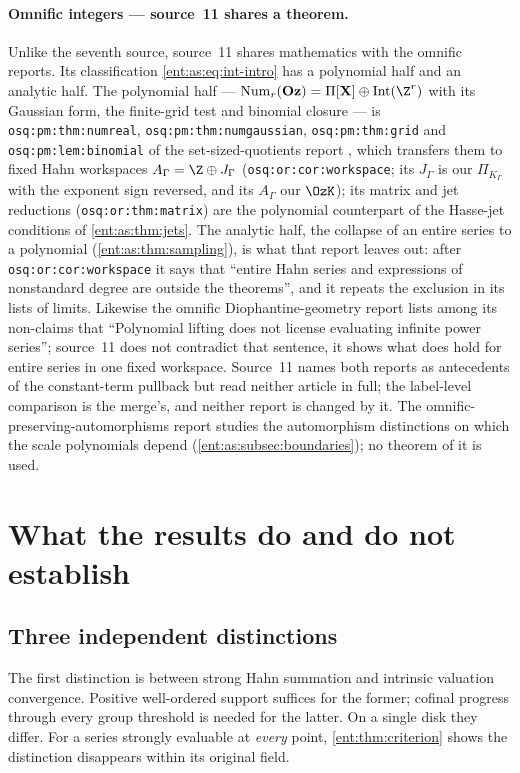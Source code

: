 \documentclass[11pt]{article}
\theoremstyle{plain}
\theoremstyle{plain}
\theoremstyle{plain}
\theoremstyle{definition}
\theoremstyle{definition}
\theoremstyle{definition}
\theoremstyle{definition}
\theoremstyle{remark}
\newcommand{\K}{K_\Gamma}\newcommand{\KD}{K_\Delta}
\newcommand{\Oz}{\mathbf{Oz}}\newcommand{\Ed}{\mathcal E_{\Gamma,d}}
\newcommand{\PiK}{\Pi_{\K}}\newcommand{\pg}{\mathsf p}
\DeclareMathOperator{\Int}{Int}\DeclareMathOperator{\ct}{ct}
\begin{document}
\paragraph{Omnific integers --- source~11 shares a theorem.}
Unlike the seventh source, source~11 shares mathematics with the omnific
reports. Its classification \eqref{ent:as:eq:int-intro} has a polynomial half
and an analytic half. The polynomial half ---
$\operatorname{Num}_r(\Oz)=\Pi[\mathbf X]\oplus\Int(\Z^r)$ with its Gaussian form,
the finite-grid test and binomial closure --- is \texttt{osq:pm:thm:numreal},
\texttt{osq:pm:thm:numgaussian}, \texttt{osq:pm:thm:grid} and
\texttt{osq:pm:lem:binomial} of the set-sized-quotients report
\cite{RepoQuotients}, which transfers them to fixed Hahn workspaces
$A_\Gamma=\Z\oplus J_\Gamma$ (\texttt{osq:or:cor:workspace}; its $J_\Gamma$ is
our $\PiK$ with the exponent sign reversed, and its $A_\Gamma$ our $\OzK$); its
matrix and jet reductions (\texttt{osq:or:thm:matrix}) are the polynomial
counterpart of the Hasse-jet conditions of \cref{ent:as:thm:jets}. The
analytic half, the collapse of an entire series to a polynomial
(\cref{ent:as:thm:sampling}), is what that report leaves out: after
\texttt{osq:or:cor:workspace} it says that ``entire Hahn series and expressions
of nonstandard degree are outside the theorems'', and it repeats the exclusion
in its lists of limits. Likewise the omnific Diophantine-geometry report
\cite{RepoODG} lists among its non-claims that ``Polynomial lifting does not
license evaluating infinite power series''; source~11 does not contradict that
sentence, it shows what does hold for entire series in one fixed workspace.
Source~11 names both reports as antecedents of the constant-term pullback but
read neither article in full; the label-level comparison is the merge's, and
neither report is changed by it. The omnific-preserving-automorphisms report
\cite{RepoOPA} studies the automorphism distinctions on which the scale
polynomials depend (\cref{ent:as:subsec:boundaries}); no theorem of it is
used.

\section{What the results do and do not establish}
\label{ent:sec:scope}

\subsection{Three independent distinctions}
\label{ent:subsec:three-distinctions}
The first distinction is between strong Hahn summation and intrinsic
valuation convergence. Positive well-ordered support suffices for the former;
cofinal progress through every group threshold is needed for the latter. On a
single disk they differ. For a series strongly evaluable at \emph{every}
point, \cref{ent:thm:criterion} shows the distinction disappears within its
original field.
\end{document}
